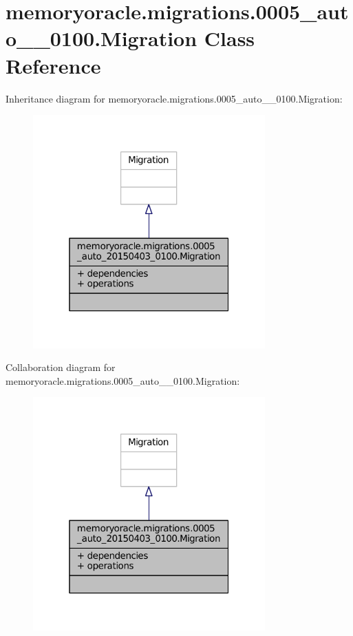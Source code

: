 \hypertarget{classmemoryoracle_1_1migrations_1_10005__auto__20150403__0100_1_1Migration}{}\section{memoryoracle.\+migrations.0005\+\_\+auto\+\_\+\_\+0100.Migration Class Reference}
\label{classmemoryoracle_1_1migrations_1_10005__auto__20150403__0100_1_1Migration}


Inheritance diagram for memoryoracle.\+migrations.0005\+\_\+auto\+\_\+\_\+0100.Migration\+:\nopagebreak
\begin{figure}[H]
\begin{center}
\leavevmode
\includegraphics[width=253pt]{classmemoryoracle_1_1migrations_1_10005__auto__20150403__0100_1_1Migration__inherit__graph}
\end{center}
\end{figure}


Collaboration diagram for memoryoracle.\+migrations.0005\+\_\+auto\+\_\+\_\+0100.Migration\+:\nopagebreak
\begin{figure}[H]
\begin{center}
\leavevmode
\includegraphics[width=253pt]{classmemoryoracle_1_1migrations_1_10005__auto__20150403__0100_1_1Migration__coll__graph}
\end{center}
\end{figure}
